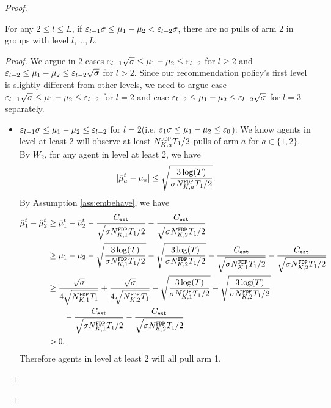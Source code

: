 \begin{proof}
\begin{claim}
\label{clm:l2_exploit}
For any $2 \leq l \leq L$, if $\varepsilon_{l-1} \NG\leq \mu_1 - \mu_2 < \varepsilon_{l-2} \NG$, there are no pulls of arm 2 in groups with level $l,...,L$. 
\end{claim}

\begin{proof}
We argue in 2 cases $\varepsilon_{l-1} \sqrt{\NG} \leq \mu_1 - \mu_2 \leq \varepsilon_{l-2}$ for $l \geq 2$ and $\varepsilon_{l-2}  \leq \mu_1 - \mu_2 \leq \varepsilon_{l-2} \sqrt{\NG}$ for $l > 2$. Since our recommendation policy's first level is slightly different from other levels, we need to argue case $\varepsilon_{l-1} \sqrt{\NG} \leq \mu_1 - \mu_2 \leq \varepsilon_{l-2}$ for $l=2$ and case $\varepsilon_{l-2}  \leq \mu_1 - \mu_2 \leq \varepsilon_{l-2} \sqrt{\NG}$ for $l =3$ separately.

\begin{itemize}
\item $\varepsilon_{l-1} \NG \leq \mu_1 - \mu_2 \leq \varepsilon_{l-2}$ for $l = 2$(i.e. $\varepsilon_1\NG\leq \mu_1 - \mu_2 \leq \varepsilon_0$): We know agents in level at least 2 will observe at least $\fdpN T_1/2$ pulls of arm $a$ for $a \in \{1,2\}$. By $W_2$, for any agent in level at least 2, we have
\[
|\bar{\mu}_a^t - \mu_a| \leq \sqrt{\frac{3\log(T)}{\NG\fdpN T_1/2}}.
\]
By Assumption \ref{ass:embehave}, we have
\begin{align*}
\hat{\mu}_1^t - \hat{\mu}_2^t &\geq \bar{\mu}_1^t - \bar{\mu}_2^t - \frac{\estC}{\sqrt{\NG\fdpN[1]T_1/2}} -  \frac{\estC}{\sqrt{\NG\fdpN[2]T_1/2}}\\
&\geq \mu_1 -\mu_2-\sqrt{\frac{3\log(T)}{\NG\fdpN[1]T_1/2}} - \sqrt{\frac{3\log(T)}{\NG\fdpN[2]T_1/2}}- \frac{\estC}{\sqrt{\NG\fdpN[1]T_1/2}} -  \frac{\estC}{\sqrt{\NG\fdpN[2]T_1/2}}\\
&\geq\frac{\sqrt{\NG}}{4\sqrt{\fdpN[1]T_1}} +  \frac{\sqrt{\NG}}{4\sqrt{\fdpN[2]T_1}}-\sqrt{\frac{3\log(T)}{\NG\fdpN[1]T_1/2}} - \sqrt{\frac{3\log(T)}{\NG\fdpN[2]T_1/2}}\\
&~~~~~~- \frac{\estC}{\sqrt{\NG\fdpN[1]T_1/2}} -  \frac{\estC}{\sqrt{\NG\fdpN[2]T_1/2}}\\
&>0.
\end{align*}
Therefore agents in level at least 2 will all pull arm 1. 


\end{itemize}
\end{proof}
\end{proof}
